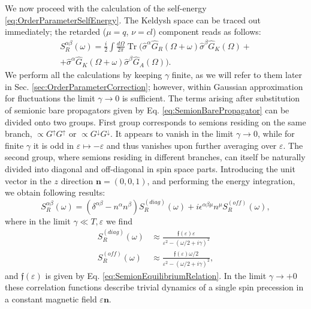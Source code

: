 \documentclass[twocolumn,english,prb]{revtex4-1}
\newcommand{\Tr}{\operatorname{Tr}}
\begin{document}
We now proceed with the calculation of the self-energy \eqref{eq:OrderParameterSelfEnergy}. The Keldysh space can be traced out immediately; the retarded ($\mu = q$, $\nu = cl$) component reads as follows:
\begin{multline}
\label{eq:SpinCorrelationFunction}
S_{R}^{\alpha\beta}(\omega)=\frac{i}{2}\int \frac{d\Omega}{2\pi}\Tr\Big(\hat{\sigma}^{\alpha}\hat{G}_{R}(\Omega+\omega)\hat{\sigma}^{\beta}\hat{G}_{K}(\Omega)+ \\
+\hat{\sigma}^{\alpha}\hat{G}_{K}(\Omega+\omega)\hat{\sigma}^{\beta}\hat{G}_{A}(\Omega)\Big).
\end{multline}
We perform all the calculations by keeping $\gamma$ finite, as we will refer to them later in Sec. \ref{sec:OrderParameterCorrection}; however, within  Gaussian approximation for fluctuations
the limit $\gamma \to 0$ is sufficient.
The terms arising after substitution of semionic bare propagators given by Eq. \eqref{eq:SemionBarePropagator} can be divided onto two groups. First group corresponds to semions residing on the same branch, $\propto G^{\uparrow}G^{\uparrow}$ or $\propto G^{\downarrow} G^{\downarrow}$. It appears to vanish in the limit $\gamma \to 0$, while for finite $\gamma$ it is odd in $\varepsilon\mapsto -\varepsilon$ and thus vanishes upon further averaging over $\varepsilon$. 
The second group, where semions residing in different branches, can itself be naturally divided into diagonal and off-diagonal in spin space parts. Introducing the unit vector in the $z$ direction $\boldsymbol{n} = (0, 0, 1)$, and performing the energy integration, we obtain following results:
\begin{equation}
\label{eq:SRstructure}
S_{R}^{\alpha\beta}(\omega) = (\delta^{\alpha\beta}-n^{\alpha}n^{\beta}) S_{R}^{(diag)}(\omega) +i\epsilon^{\alpha\beta\mu}n^{\mu} S_{R}^{(off)}(\omega),
\end{equation}
where in the limit $\gamma \ll T,\varepsilon$ we find
\begin{align}
\label{eq:SRdiag}
S_{R}^{(diag)}(\omega) &\approx \frac{\mathfrak{f}(\varepsilon) \varepsilon}{\varepsilon^2-(\omega/2 + i\gamma)^2}\\
\label{eq:SRoffdiag}
S_{R}^{(off)}(\omega) &\approx  \frac{\mathfrak{f}(\varepsilon) \omega / 2}{\varepsilon^{2}-(\omega/2+i\gamma)^{2}},
\end{align}
and $\mathfrak{f}(\varepsilon)$ is given by Eq. \eqref{eq:SemionEquilibriumRelation}. In the limit $\gamma \to +0$ these correlation functions describe trivial dynamics of a single spin precession in a constant magnetic field $\varepsilon\boldsymbol{n}$.
\end{document}
